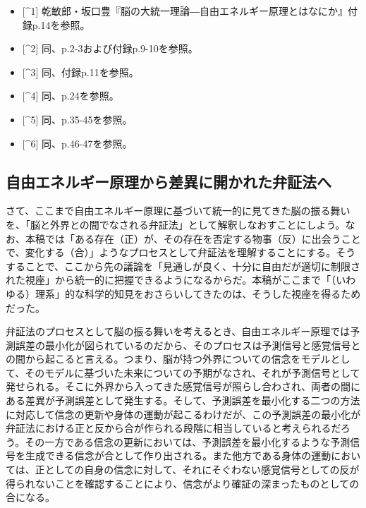 \begin{itemize}
\tightlist
\item
  {[}\^{}1{]}
  乾敏郎・坂口豊『脳の大統一理論―自由エネルギー原理とはなにか』付録p.14を参照。
\item
  {[}\^{}2{]} 同、p.2-3および付録p.9-10を参照。
\item
  {[}\^{}3{]} 同、付録p.11を参照。
\item
  {[}\^{}4{]} 同、p.24を参照。
\item
  {[}\^{}5{]} 同、p.35-45を参照。
\item
  {[}\^{}6{]} 同、p.46-47を参照。
\end{itemize}

\subsection{自由エネルギー原理から差異に開かれた弁証法へ}\label{ux81eaux7531ux30a8ux30cdux30ebux30aeux30fcux539fux7406ux304bux3089ux5deeux7570ux306bux958bux304bux308cux305fux5f01ux8a3cux6cd5ux3078}

さて、ここまで自由エネルギー原理に基づいて統一的に見てきた脳の振る舞いを、「脳と外界との間でなされる弁証法」として解釈しなおすことにしよう。なお、本稿では「ある存在（正）が、その存在を否定する物事（反）に出会うことで、変化する（合）」ようなプロセスとして弁証法を理解することにする。そうすることで、ここから先の議論を「見通しが良く、十分に自由だが適切に制限された視座」から統一的に把握できるようになるからだ。本稿がここまで「（いわゆる）理系」的な科学的知見をおさらいしてきたのは、そうした視座を得るためだった。

弁証法のプロセスとして脳の振る舞いを考えるとき、自由エネルギー原理では予測誤差の最小化が図られているのだから、そのプロセスは予測信号と感覚信号との間から起こると言える。つまり、脳が持つ外界についての信念をモデルとして、そのモデルに基づいた未来についての予期がなされ、それが予測信号として発せられる。そこに外界から入ってきた感覚信号が照らし合わされ、両者の間にある差異が予測誤差として発生する。そして、予測誤差を最小化する二つの方法に対応して信念の更新や身体の運動が起こるわけだが、この予測誤差の最小化が弁証法における正と反から合が作られる段階に相当していると考えられるだろう。その一方である信念の更新においては、予測誤差を最小化するような予測信号を生成できる信念が合として作り出される。また他方である身体の運動においては、正としての自身の信念に対して、それにそぐわない感覚信号としての反が得られないことを確認することにより、信念がより確証の深まったものとしての合になる。

